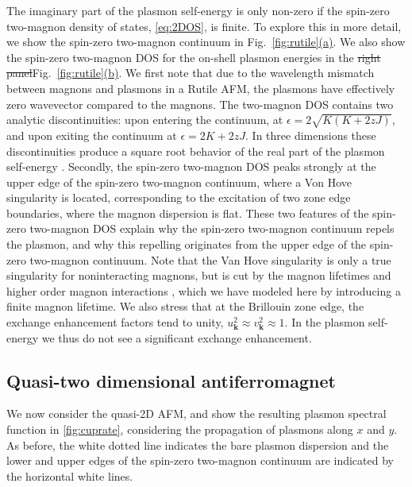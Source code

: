 \documentclass[aps,prb,reprint,twocolumns,superscriptaddress,nofootinbib]{revtex4-2}
\makeatletter
\newcommand{\subfigref}[2]{Fig.~\hyperref[#1]{\ref*{#1}#2}}
\providecommand{\DIFdeltex}[1]{{\protect\color{red}\sout{#1}}} %
\providecommand{\DIFaddbegin}{} %
\providecommand{\DIFaddend}{} %
\providecommand{\DIFdelbegin}{} %
\providecommand{\DIFdelend}{} %
\providecommand{\DIFdel}[1]{\texorpdfstring{\DIFdeltex{#1}}{}} %
\newcommand{\DIFscaledelfig}{0.5}
\newlength{\DIFdelgraphicswidth} %
\newlength{\DIFdelgraphicsheight} %
\newcommand{\DIFaddincludegraphics}[2][]{{\color{blue}\fbox{\DIFOincludegraphics[#1]{#2}}}} %
\newcommand{\DIFdelincludegraphics}[2][]{%
\sbox{\DIFdelgraphicsbox}{\DIFOincludegraphics[#1]{#2}}%
\settoboxwidth{\DIFdelgraphicswidth}{\DIFdelgraphicsbox} %
\settoboxtotalheight{\DIFdelgraphicsheight}{\DIFdelgraphicsbox} %
\scalebox{\DIFscaledelfig}{%
\parbox[b]{\DIFdelgraphicswidth}{\usebox{\DIFdelgraphicsbox}\\[-\baselineskip] \rule{\DIFdelgraphicswidth}{0em}}\llap{\resizebox{\DIFdelgraphicswidth}{\DIFdelgraphicsheight}{%
\setlength{\unitlength}{\DIFdelgraphicswidth}%
\begin{picture}(1,1)%
\thicklines\linethickness{2pt} %
{\color[rgb]{1,0,0}\put(0,0){\framebox(1,1){}}}%
{\color[rgb]{1,0,0}\put(0,0){\line( 1,1){1}}}%
{\color[rgb]{1,0,0}\put(0,1){\line(1,-1){1}}}%
\end{picture}%
}\hspace*{3pt}}} %
} %
\DeclareRobustCommand{\DIFaddbegin}{\DIFOaddbegin \let\includegraphics\DIFaddincludegraphics} %
\DeclareRobustCommand{\DIFaddend}{\DIFOaddend \let\includegraphics\DIFOincludegraphics} %
\DeclareRobustCommand{\DIFdelbegin}{\DIFOdelbegin \let\includegraphics\DIFdelincludegraphics} %
\DeclareRobustCommand{\DIFdelend}{\DIFOaddend \let\includegraphics\DIFOincludegraphics} %
\let\sout@orig\sout %
\renewcommand{\sout}[1]{\ifmmode\text{\sout@orig{\ensuremath{#1}}}\else\sout@orig{#1}\fi} %
\makeatother
\begin{document}
	The imaginary part of the plasmon self-energy is only non-zero if the spin-zero two-magnon density of states, \cref{eq:2DOS}, is finite. To explore this in more detail, we show the spin-zero two-magnon continuum in \subfigref{fig:rutile}{(a)}. We also show the spin-zero two-magnon DOS for the on-shell plasmon energies in the \DIFdelbegin \DIFdel{right panel}\DIFdelend \DIFaddbegin \subfigref{fig:rutile}{(b)}\DIFaddend . 
	We first note that due to the wavelength mismatch between magnons and plasmons in a Rutile AFM, the plasmons have effectively zero wavevector compared to the magnons.  The two-magnon DOS contains two analytic discontinuities: upon entering the continuum, at $\epsilon=2\sqrt{K(K+2zJ)}$, and upon exiting the continuum at $\epsilon=2K+2zJ$. In three dimensions these discontinuities produce a square root behavior of the real part of the plasmon self-energy \cite{chernyshevSpinWavesTriangular2009,zhitomirskyColloquiumSpontaneousMagnon2013}. Secondly, the spin-zero two-magnon DOS peaks strongly at the upper edge of the spin-zero two-magnon continuum, where a Von Hove singularity is located, corresponding to the excitation of two zone edge boundaries, where the magnon dispersion is flat. 
	These two features of the spin-zero two-magnon DOS explain why the spin-zero two-magnon continuum repels the plasmon, and why this repelling originates from the upper edge of the spin-zero two-magnon continuum. Note that the Van Hove singularity is only a true singularity for noninteracting magnons, but is cut by the magnon lifetimes \cite{bayrakciLifetimesAntiferromagneticMagnons2013} and higher order magnon interactions \cite{canaliTheoryRamanScattering1992}, which we have modeled here by introducing a finite magnon lifetime. We also stress that at the Brillouin zone edge, the exchange enhancement factors tend to unity, $u_{\bm k}^2\approx v_{\bm k}^2 \approx1$.  In the plasmon self-energy we thus do not see a significant exchange enhancement.

	
	\subsection{Quasi-two dimensional antiferromagnet}

	We now consider the quasi-2D AFM, and show the resulting plasmon spectral function in \cref{fig:cuprate}, considering the propagation of plasmons along $ x$ and $ y$. As before, the white dotted line indicates the bare plasmon dispersion and the lower and upper edges of the spin-zero two-magnon continuum are indicated by the horizontal white lines. 
\end{document}
